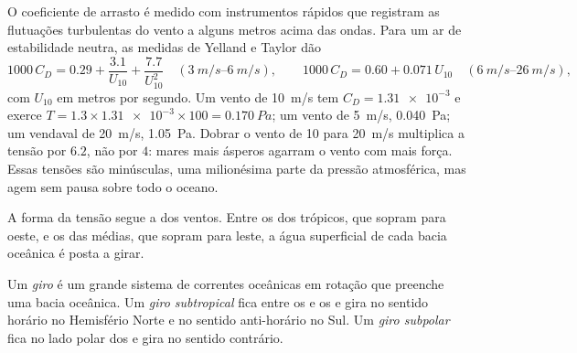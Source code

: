 O coeficiente de arrasto é medido com instrumentos rápidos que registram as flutuações turbulentas do
vento a alguns metros acima das ondas. Para um ar de estabilidade neutra, as medidas de Yelland e Taylor dão
\[
  1000\,C_D = 0.29 + \frac{3.1}{U_{10}} + \frac{7.7}{U_{10}^2}
  \quad (\qtyrange{3}{6}{m/s}),
  \qquad
  1000\,C_D = 0.60 + 0.071\,U_{10}
  \quad (\qtyrange{6}{26}{m/s}),
\]
com $U_{10}$ em metros por segundo. Um vento de \qty{10}{m/s} tem $C_D =
\num{1.31e-3}$ e exerce $T = 1.3 \times \num{1.31e-3} \times 100 =
\qty{0.170}{Pa}$; um vento de \qty{5}{m/s}, \qty{0.040}{Pa}; um vendaval de
\qty{20}{m/s}, \qty{1.05}{Pa}. Dobrar o vento de 10 para \qty{20}{m/s} multiplica a tensão por $6.2$,
não por $4$: mares mais ásperos agarram o vento com mais força. Essas tensões são minúsculas, uma
milionésima parte da pressão atmosférica, mas agem sem pausa sobre todo o oceano.

A forma da tensão segue a dos ventos. Entre os  dos trópicos, que sopram para oeste, e os  das  médias, que sopram para leste, a água superficial de cada bacia oceânica é posta
a girar.

\begin{definition}\label{def:b1:ocean-circulation:gyre}
Um \emph{giro} é um grande sistema de correntes oceânicas em rotação que preenche uma bacia
oceânica. Um \emph{giro subtropical} fica entre os  e os  e
gira no sentido horário no Hemisfério Norte e no sentido anti-horário no Sul. Um \emph{giro subpolar}
fica no lado polar dos  e gira no sentido contrário.
\end{definition}

